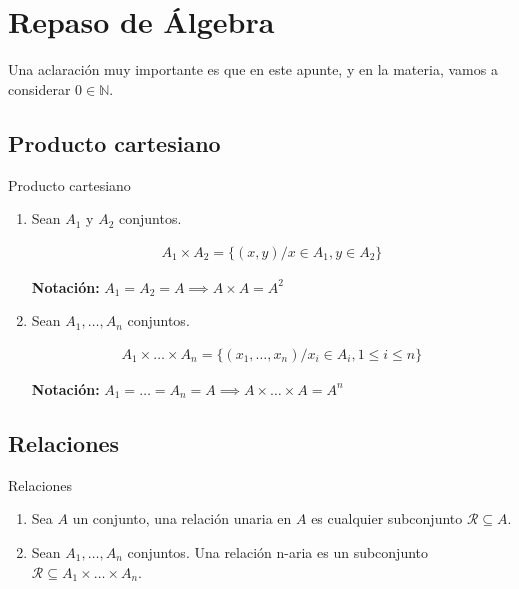 \chapter{Repaso de Álgebra}
\graphicspath{ {./teoria/resources/repaso/} }

Una aclaración muy importante es que en este apunte, y en la  materia, vamos a
considerar $0 \in \mathbb{N}$.

\section{Producto cartesiano}

\begin{definicion}{Producto cartesiano}{}
    \begin{enumerate}
    
        \item Sean $A_1$ y $A_2$ conjuntos.
    
        \begin{gather*}
            A_1 \times A_2 = \{ (x,y) / x \in A_1, y \in A_2 \} 
        \end{gather*}
    
        \bigskip
        \textbf{Notación:} $A_1 = A_2 = A \implies A \times A = A^2$
    
        \item Sean $A_1, \dotsc, A_n$ conjuntos.
    
        \begin{gather*}
            A_1 \times \dots \times A_n 
                = \{ (x_1, \dotsc, x_n) / x_i \in A_i, 1 \leq i \leq n \}
        \end{gather*}
    
        \bigskip
        \textbf{Notación:} 
        $A_1 = \dots = A_n = A \implies A \times \dots \times A = A^n$
    
    \end{enumerate}
\end{definicion}

\section{Relaciones}

\begin{definicion}{Relaciones}{}
    \begin{enumerate}
        \item Sea $A$ un conjunto, una relación unaria en $A$ es cualquier 
            subconjunto $\mathcal{R} \subseteq A$.
    
        
        \item Sean $A_1 , \dotsc , A_n$ conjuntos. Una relación n-aria es un 
            subconjunto $\mathcal{R}\subseteq A_1 \times \dots \times A_n$.
    
    \end{enumerate}
\end{definicion}

